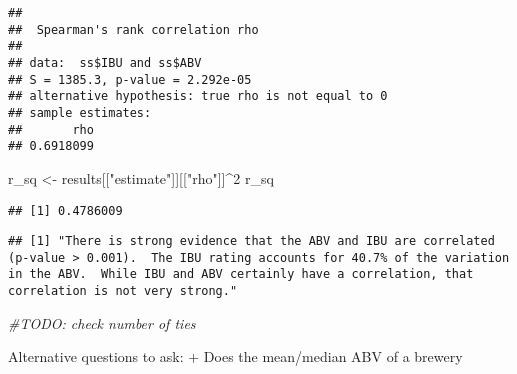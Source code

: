 \documentclass[]{article}
\newenvironment{Shaded}{\begin{snugshade}}{\end{snugshade}}
\newcommand{\KeywordTok}[1]{\textcolor[rgb]{0.13,0.29,0.53}{\textbf{#1}}}
\newcommand{\DecValTok}[1]{\textcolor[rgb]{0.00,0.00,0.81}{#1}}
\newcommand{\StringTok}[1]{\textcolor[rgb]{0.31,0.60,0.02}{#1}}
\newcommand{\CommentTok}[1]{\textcolor[rgb]{0.56,0.35,0.01}{\textit{#1}}}
\newcommand{\OperatorTok}[1]{\textcolor[rgb]{0.81,0.36,0.00}{\textbf{#1}}}
\newcommand{\NormalTok}[1]{#1}
\begin{document}
\begin{verbatim}
## 
##  Spearman's rank correlation rho
## 
## data:  ss$IBU and ss$ABV
## S = 1385.3, p-value = 2.292e-05
## alternative hypothesis: true rho is not equal to 0
## sample estimates:
##       rho 
## 0.6918099
\end{verbatim}

\begin{Shaded}
\begin{Highlighting}[]
\NormalTok{r_sq <-}\StringTok{ }\NormalTok{results[[}\StringTok{"estimate"}\NormalTok{]][[}\StringTok{"rho"}\NormalTok{]]}\OperatorTok{^}\DecValTok{2}
\NormalTok{r_sq}
\end{Highlighting}
\end{Shaded}

\begin{verbatim}
## [1] 0.4786009
\end{verbatim}

\begin{Shaded}
\end{Shaded}

\begin{verbatim}
## [1] "There is strong evidence that the ABV and IBU are correlated (p-value > 0.001).  The IBU rating accounts for 40.7% of the variation in the ABV.  While IBU and ABV certainly have a correlation, that correlation is not very strong."
\end{verbatim}

\begin{Shaded}
\begin{Highlighting}[]
\CommentTok{#TODO: check number of ties}
\end{Highlighting}
\end{Shaded}

Alternative questions to ask: + Does the mean/median ABV of a brewery
\end{document}
